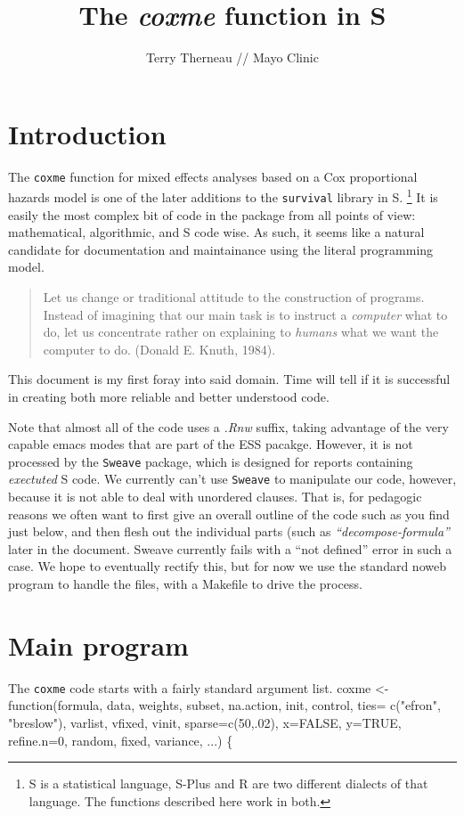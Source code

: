 \documentclass{article}
\title{The \emph{coxme} function in S}
\author{Terry Therneau // Mayo Clinic}
\begin{document}
\maketitle
\tableofcontents
\section{Introduction}
 The {\tt{}coxme} function for mixed effects analyses based on a Cox
proportional hazards model is one of the later additions to the
{\tt{}survival} library in S.
\footnote{S is a statistical language, S-Plus and R are two different
dialects of that language.  The functions described here work in both.}
It is easily the most complex bit of code in the package from all points
of view: mathematical, algorithmic, and S code wise.
As such, it seems like a natural candidate for documentation and 
maintainance using the literal programming model.  
\begin{quotation}
Let us change or traditional attitude to the construction of programs.
Instead of imagining that our main task is to instruct a \emph{computer}
what to do, let us concentrate rather on explaining to \emph{humans}
what we want the computer to do.  (Donald E. Knuth, 1984).
\end{quotation}

This document is my first foray into said domain.  
Time will tell if it is successful in creating both more reliable and
better understood code.

Note that almost all of the code uses a \emph{.Rnw} suffix, taking
advantage of the very capable emacs modes that are part of the ESS pacakge.
However, it is not processed by the {\tt{}Sweave}
package, which is designed for reports containing 
\emph{exectuted} S code.   
We currently can't use {\tt{}Sweave} to manipulate our code, however,
because it is not able to deal with unordered clauses.
That is, for pedagogic reasons we often want to first give an overall
outline of the code such as you find just below, and then flesh out 
the individual parts (such as \emph{``decompose-formula''} later
in the document.  Sweave currently fails with a ``not defined''
error in such a case.
We hope to eventually rectify this, but for now
we use the
standard noweb program to handle the files, with a Makefile to drive
the process.

\section{Main program}
The {\tt{}coxme} code starts with a fairly standard argument list.
\endmoddef
coxme <- function(formula,  data, 
        weights, subset, na.action, init, 
        control, ties= c("efron", "breslow"),
        varlist, vfixed, vinit, sparse=c(50,.02),
        x=FALSE, y=TRUE, 
        refine.n=0, random, fixed, variance,  ...) \{
\end{document}
